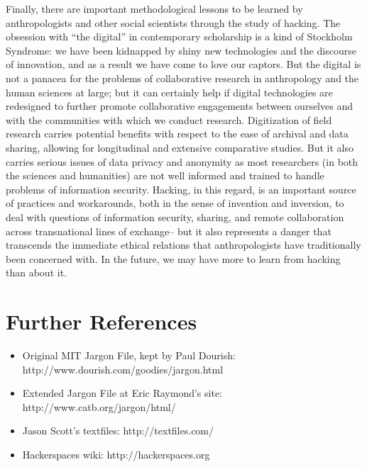 \documentclass[10pt,letter,oneside]{scrartcl}
\begin{document}
Finally, there are important methodological lessons to be learned by
anthropologists and other social scientists through the study of hacking. The
obsession with ``the digital'' in contemporary scholarship is a kind of
Stockholm Syndrome: we have been kidnapped by shiny new technologies and the
discourse of innovation, and as a result we have come to love our captors. But
the digital is not a panacea for the problems of collaborative research in
anthropology and the human sciences at large; but it can certainly help if
digital technologies are redesigned to further promote collaborative engagements
between ourselves and with the communities with which we conduct
research. Digitization of field research carries potential benefits with respect
to the ease of archival and data sharing, allowing for longitudinal and
extensive comparative studies.  But it also carries serious issues of data
privacy and anonymity as most researchers (in both the sciences and humanities)
are not well informed and trained to handle problems of information security.
Hacking, in this regard, is an important source of practices and workarounds,
both in the sense of invention and inversion, to deal with questions of
information security, sharing, and remote collaboration across transnational
lines of exchange-- but it also represents a danger that transcends the
immediate ethical relations that anthropologists have traditionally been
concerned with. In the future, we may have more to learn from hacking than about
it.


\section*{Further References}

\begin{itemize}
\item  Original MIT Jargon File, kept by Paul Dourish:
  http://www.dourish.com/goodies/jargon.html 
\item  Extended Jargon File at Eric Raymond's site:
  http://www.catb.org/jargon/html/
\item Jason Scott's textfiles:
  http://textfiles.com/ 
\item Hackerspaces wiki: 
  http://hackerspaces.org
\end{itemize}

% 

\printbibliography 
\end{document}
